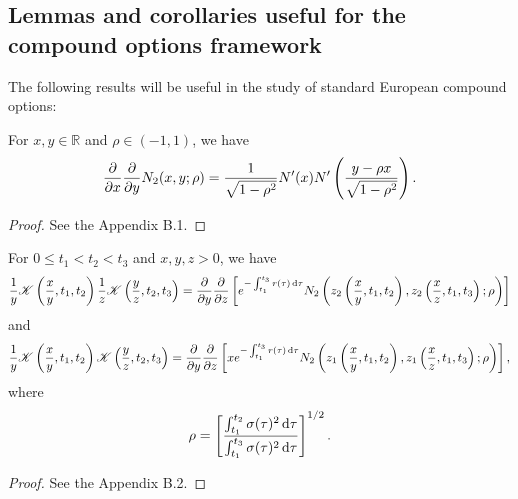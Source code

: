 \subsection{Lemmas and corollaries useful for the compound options framework}
The following results will be useful in the study of standard European compound options:
\begin{lemma}
		\label{lem:B1}
		For $x, y \in \mathbb{R}$ and $\rho \in (-1,1)$, we have
			\begin{equation}
				\label{eqn:N2pp}
				\frac{\partial}{\partial x}\frac{\partial}{\partial y} N_2(x,y;\rho) = \frac{1}{\sqrt{1-\rho^2}}N'(x)N'\left( \frac{y-\rho x}{\sqrt{1-\rho^2}} \right).
			\end{equation}
	\end{lemma}
	\begin{proof}
		See the Appendix B.1.
	\end{proof}
	\begin{lemma}
		\label{lem:B2}
		For $0 \leq t_1 < t_2 < t_3$ and $x,y,z > 0$, we have
			\begin{equation}
				\label{eqn:KK}
				\frac{1}{y}\mathscr K\left(\frac{x}{y},t_1,t_2\right)\frac{1}{z}\mathscr K\left(\frac{y}{z},t_2,t_3\right) = \frac{\partial}{\partial y}\frac{\partial}{\partial z}\left[ e^{-\int_{t_1}^{t_3} r(\tau) \,\mathrm d\tau} N_2\left(z_2\left( \frac{x}{y},t_1,t_2 \right), z_2\left( \frac{x}{z},t_1,t_3 \right); \rho \right) \right]
				\end{equation}
			and
			\begin{equation}
				\label{eqn:KK2}
				\frac{1}{y}\mathscr K\left( \frac{x}{y}, t_1, t_2 \right)\mathscr K\left( \frac{y}{z}, t_2, t_3 \right) =
			\frac{\partial}{\partial y}\frac{\partial}{\partial z}\left[ xe^{-\int_{t_1}^{t_3} r(\tau) \,\mathrm d\tau} N_2\left(z_1\left( \frac{x}{y},t_1,t_2 \right), z_1\left( \frac{x}{z},t_1,t_3 \right); \rho \right) \right],
			\end{equation}
			where
			\begin{equation}
				\label{eqn:rho}
				\rho = \left[ \frac{\int_{t_1}^{t_2} \sigma(\tau)^2 \, \mathrm d\tau}{\int_{t_1}^{t_3} \sigma(\tau)^2 \, \mathrm d\tau} \right]^{1/2}.
			\end{equation}
	\end{lemma}
	\begin{proof}
		See the Appendix B.2.
	\end{proof}
